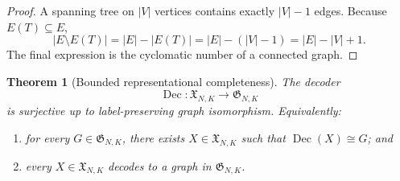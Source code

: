 \documentclass{article}
\newtheorem{theorem}{Theorem}[section]
\begin{document}
\begin{proof}
A spanning tree on $|V|$ vertices contains exactly $|V|-1$ edges.
Because $E(T)\subseteq E$,
\begin{equation}
    |E\setminus E(T)|
    =
    |E|-|E(T)|
    =
    |E|-(|V|-1)
    =
    |E|-|V|+1.
\end{equation}
The final expression is the cyclomatic number of a connected graph.
\end{proof}

\begin{theorem}[Bounded representational completeness]
\label{thm:bounded-representation}
The decoder
\begin{equation}
    \operatorname{Dec}:
    \mathfrak{X}_{N,K}
    \longrightarrow
    \mathfrak{G}_{N,K}
\end{equation}
is surjective up to label-preserving graph isomorphism.
Equivalently:
\begin{enumerate}
    \item for every $G\in\mathfrak{G}_{N,K}$, there exists
    $X\in\mathfrak{X}_{N,K}$ such that $\operatorname{Dec}(X)\cong G$; and
    \item every $X\in\mathfrak{X}_{N,K}$ decodes to a graph in
    $\mathfrak{G}_{N,K}$.
\end{enumerate}
\end{theorem}
\end{document}
